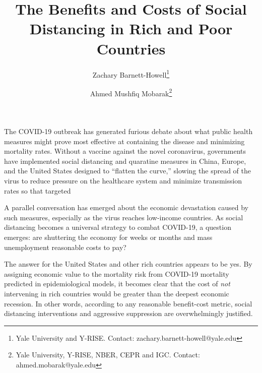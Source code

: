 \documentclass[11pt]{article}
\author{Zachary Barnett-Howell\thanks{Yale University and Y-RISE. Contact: zachary.barnett-howell@yale.edu} \and Ahmed Mushfiq Mobarak\thanks{Yale University, Y-RISE, NBER, CEPR and IGC. Contact: ahmed.mobarak@yale.edu} }
\title{The Benefits and Costs of Social Distancing in Rich and Poor Countries}
\begin{document}
\maketitle


The COVID-19 outbreak has generated furious debate about what public health measures might prove most effective at containing the disease and minimizing mortality rates. Without a vaccine against the novel coronavirus, governments have implemented social distancing and quaratine measures in China, Europe, and the United States designed to ``flatten the curve,'' slowing the spread of the virus to reduce pressure on the healthcare system and minimize transmission rates so that targeted %

A parallel conversation has emerged about the economic devastation caused by such measures, especially as the virus reaches low-income countries. As social distancing becomes a universal strategy to combat COVID-19, a question emerges: are shuttering the economy for weeks or months and mass unemployment reasonable costs to pay? 

The answer for the United States and other rich countries appears to be yes. By assigning economic value to the mortality risk from COVID-19 mortality predicted in epidemiological models, it becomes clear that the cost of \textit{not} intervening in rich countries would be greater than the deepest economic recession. In other words, according to any reasonable benefit-cost metric, social distancing interventions and aggressive suppression are overwhelmingly justified.
\end{document}
